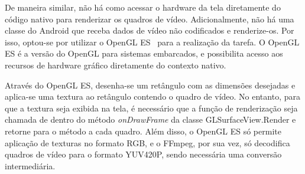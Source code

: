 \documentclass{acm_proc_article-sp}
\begin{document}

De maneira similar, não há como acessar o hardware da tela diretamente do código nativo para renderizar os quadros de vídeo. Adicionalmente, não há uma classe do Android que receba dados de vídeo não codificados e renderize-os. Por isso, optou-se por utilizar o OpenGL ES~\cite{opengl} para a realização da tarefa. O OpenGL ES é a versão do OpenGL para sistemas embarcados, e possibilita acesso aos recursos de hardware gráfico diretamente do contexto nativo.

Através do OpenGL ES, desenha-se um retângulo com as dimensões desejadas e aplica-se uma textura ao retângulo contendo o quadro de vídeo. No entanto, para que a textura seja exibida na tela, é necessário que a função de renderização seja chamada de dentro do método \emph{onDrawFrame} da classe GLSurfaceView.Render e retorne para o método a cada quadro. Além disso, o OpenGL ES só permite aplicação de texturas no formato RGB, e o FFmpeg, por sua vez, só decodifica quadros de vídeo para o formato YUV420P, sendo necessária uma conversão intermediária.
\end{document}
